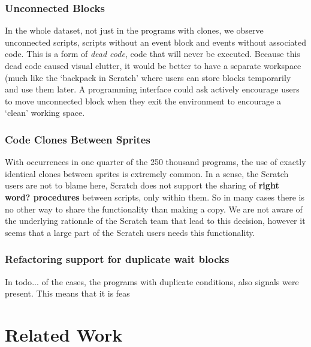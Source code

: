 \documentclass{sig-alternate}
\newcommand{\todo}[1]{\textbf{#1}}
\begin{document}
\subsubsection{Unconnected Blocks}
In the whole dataset, not just in the programs with clones, we observe unconnected scripts, scripts without an event block and events without associated code. This is a form of \emph{dead code}, code that will never be executed. Because this dead code caused visual clutter, it would be better to have a separate workspace (much like the `backpack in Scratch' where users can store blocks temporarily and use them later. A programming interface could ask actively encourage users to move unconnected block when they exit the environment to encourage a `clean' working space. 

\subsubsection{Code Clones Between Sprites}
With occurrences in one quarter of the 250 thousand programs, the use of exactly identical clones between sprites is extremely common. In a sense, the Scratch users are not to blame here, Scratch does not support the sharing of \todo{right word? procedures} between scripts, only within them. So in many cases there is no other way to share the functionality than making a copy. We are not aware of the underlying rationale of the Scratch team that lead to this decision, however it seems that a large part of the Scratch users needs this functionality. 

\subsubsection{Refactoring support for duplicate wait blocks}
In todo{...} of the cases, the programs with duplicate conditions, also signals were present. This means that it is feas




\section{Related Work}
\label{sec:related}
\end{document}

